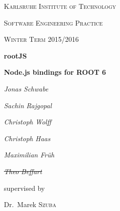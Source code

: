 \begin{titlepage}
	\centering
	{\scshape\LARGE Karlsruhe Institute of Technology \par}
	\vspace{1cm}
	{\scshape\Large Software Engineering Practice\par}
	\vspace{0.5cm}
	{\scshape\large Winter Term 2015/2016\par}
	\vspace{1.5cm}
	{\Huge\bfseries rootJS\par}
	\vspace{0.25cm}
	{\Large\bfseries Node.js bindings for ROOT 6\par}
	\vspace{2cm}
	{\Large\itshape Jonas Schwabe\par}
	{\Large\itshape Sachin Rajgopal\par}
	{\Large\itshape Christoph Wolff\par}
	{\Large\itshape Christoph Haas\par}
	{\Large\itshape Maximilian Fr\"uh\par}
	{\Large\itshape \sout{Theo Beffart}\par}
	
	\vfill
	supervised by\par
	Dr.~Marek \textsc{Szuba}
	
	\vfill
	
	{\large \date{30.11.2015}\par}
\end{titlepage}
